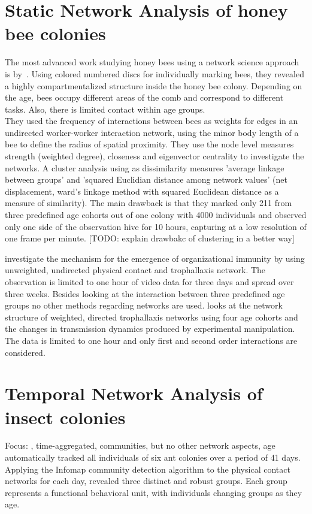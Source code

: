 \section{Static Network Analysis of honey bee colonies}
The most advanced work studying honey bees using a network science approach is by~\textcite{baracchi2014socio}. Using colored numbered discs for individually marking bees, they revealed a highly compartmentalized structure inside the honey bee colony. Depending on the age, bees occupy different areas of the comb and correspond to different tasks. Also, there is limited contact within age groups.\\
They used the frequency of interactions between bees as weights for edges in an undirected worker-worker interaction network, using the minor body length of a bee to define the radius of spatial proximity.
They use the node level measures strength (weighted degree), closeness and eigenvector centrality to investigate the networks. A cluster analysis using as dissimilarity measures 'average linkage between groups' and 'squared Euclidian distance among network values' (net displacement, ward's linkage method with squared Euclidean distance as a measure of similarity).
The main drawback is that they marked only 211 from three predefined age cohorts out of one colony with 4000 individuals and observed only one side of the observation hive for 10 hours, capturing at a low resolution of one frame per minute. [TODO: explain drawbakc of clustering in a better way]

\textcite{scholl2011olfactory} investigate the mechanism for the emergence of organizational immunity by using unweighted, undirected physical contact and trophallaxis network. The observation is limited to one hour of video data for three days and spread over three weeks. Besides looking at the interaction between three predefined age groups no other methods regarding networks are used.  
\cite{naug2008structure} looks at the network structure of weighted,  directed trophallaxis networks using four age cohorts and the changes in transmission dynamics produced by experimental manipulation. The data is limited to one hour and only first and second order interactions are considered.


\section{Temporal Network Analysis of insect colonies}
Focus: \textcite{mersch2013tracking}, time-aggregated, communities, but no other network aspects, age\\
\textcite{mersch2013tracking} automatically tracked all individuals of six ant colonies over a period of 41 days. Applying the Infomap community detection algorithm to the physical contact networks for each day, revealed three distinct and robust groups. Each group represents a functional behavioral unit, with individuals changing groups as they age.


